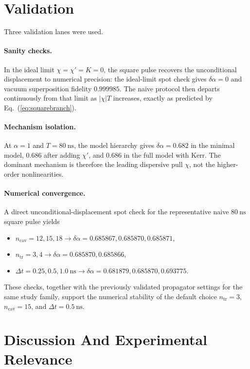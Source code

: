 \documentclass[aps,pra,twocolumn,reprint,floatfix,amsmath,amssymb]{revtex4-2}
\begin{document}
\section{Validation}
\label{sec:validation}

Three validation lanes were used.

\paragraph*{Sanity checks.}
In the ideal limit \(\chi=\chi'=K=0\), the square pulse recovers the unconditional displacement to numerical precision: the ideal-limit spot check gives \(\delta\alpha=0\) and vacuum superposition fidelity \(0.999985\). The naive protocol then departs continuously from that limit as \(|\chi|T\) increases, exactly as predicted by Eq.~(\ref{eq:squarebranch}).

\paragraph*{Mechanism isolation.}
At \(\alpha=1\) and \(T=\SI{80}{\nano\second}\), the model hierarchy gives \(\delta\alpha = 0.682\) in the minimal model, \(0.686\) after adding \(\chi'\), and \(0.686\) in the full model with Kerr. The dominant mechanism is therefore the leading dispersive pull \(\chi\), not the higher-order nonlinearities.

\paragraph*{Numerical convergence.}
A direct unconditional-displacement spot check for the representative naive \(\SI{80}{\nano\second}\) square pulse yields
\begin{itemize}
  \item \(n_{\mathrm{cav}} = 12,15,18 \rightarrow \delta\alpha = 0.685867, 0.685870, 0.685871\),
  \item \(n_{\mathrm{tr}} = 3,4 \rightarrow \delta\alpha = 0.685870, 0.685866\),
  \item \(\Delta t = 0.25, 0.5, 1.0~\si{\nano\second} \rightarrow \delta\alpha = 0.681879, 0.685870, 0.693775\).
\end{itemize}
These checks, together with the previously validated propagator settings for the same study family, support the numerical stability of the default choice \(n_{\mathrm{tr}}=3\), \(n_{\mathrm{cav}}=15\), and \(\Delta t=\SI{0.5}{\nano\second}\).

\section{Discussion And Experimental Relevance}
\label{sec:discussion}
\end{document}
